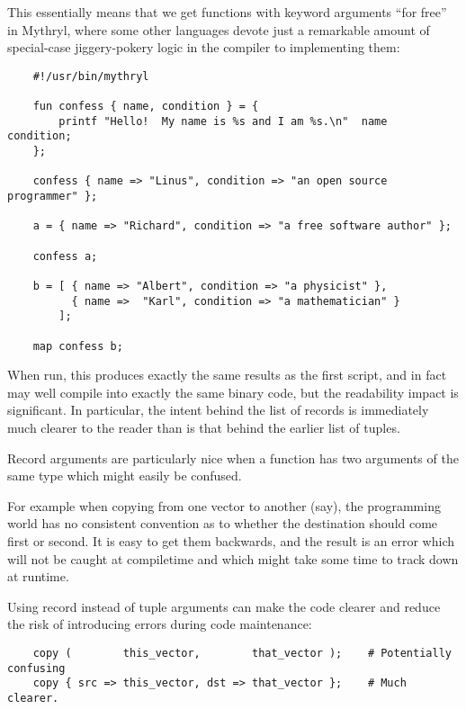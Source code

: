 This essentially means that we get functions with keyword arguments 
``for free'' in Mythryl, where some other languages devote just a 
remarkable amount of special-case jiggery-pokery logic in the compiler 
to implementing them:

\begin{verbatim}
    #!/usr/bin/mythryl

    fun confess { name, condition } = {
        printf "Hello!  My name is %s and I am %s.\n"  name  condition;
    };

    confess { name => "Linus", condition => "an open source programmer" };

    a = { name => "Richard", condition => "a free software author" };

    confess a;

    b = [ { name => "Albert", condition => "a physicist" },
          { name =>  "Karl", condition => "a mathematician" }
        ];

    map confess b;
\end{verbatim}

When run, this produces exactly the same results as the first script, and 
in fact may well compile into exactly the same binary code, but the 
readability impact is significant.  In particular, the intent behind 
the list of records is immediately much clearer to the reader than is that 
behind the earlier list of tuples.

Record arguments are particularly nice when a function has two 
arguments of the same type which might easily be confused.

For example when copying from one vector to another (say), 
the programming world has no consistent convention as to 
whether the destination should come first or second.  It 
is easy to get them backwards, and the result is an error 
which will not be caught at compiletime and which might 
take some time to track down at runtime.

Using record instead of tuple arguments can make the code 
clearer and reduce the risk of introducing errors during 
code maintenance:

\begin{verbatim}
    copy (        this_vector,        that_vector );    # Potentially confusing
    copy { src => this_vector, dst => that_vector };    # Much clearer.
\end{verbatim}

\cutend*


